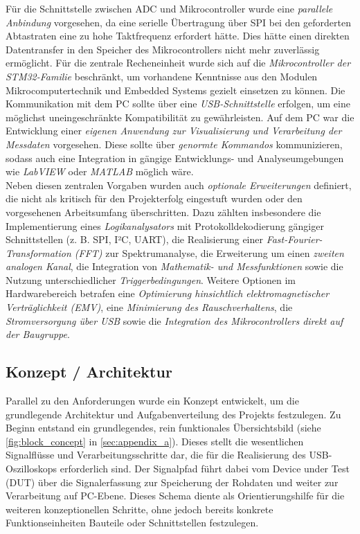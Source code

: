 \documentclass[a4paper, portrait, 12pt]{scrartcl} %
\begin{document}
Für die Schnittstelle zwischen ADC und Mikrocontroller wurde eine \emph{parallele Anbindung} vorgesehen, da eine serielle Übertragung über SPI bei den geforderten Abtastraten eine zu hohe Taktfrequenz erfordert hätte. Dies hätte einen direkten Datentransfer in den Speicher des Mikrocontrollers nicht mehr zuverlässig ermöglicht. Für die zentrale Recheneinheit wurde sich auf die \emph{Mikrocontroller der STM32-Familie} beschränkt, um vorhandene Kenntnisse aus den Modulen Mikrocomputertechnik und Embedded Systems gezielt einsetzen zu können. Die Kommunikation mit dem PC sollte über eine \emph{USB-Schnittstelle} erfolgen, um eine möglichst uneingeschränkte Kompatibilität zu gewährleisten. Auf dem PC war die Entwicklung einer \emph{eigenen Anwendung zur Visualisierung und Verarbeitung der Messdaten} vorgesehen. Diese sollte über \emph{genormte Kommandos} kommunizieren, sodass auch eine Integration in gängige Entwicklungs- und Analyseumgebungen wie \emph{LabVIEW} oder \emph{MATLAB} möglich wäre.\\

Neben diesen zentralen Vorgaben wurden auch \emph{optionale Erweiterungen} definiert, die nicht als kritisch für den Projekterfolg eingestuft wurden oder den vorgesehenen Arbeitsumfang überschritten. Dazu zählten insbesondere die Implementierung eines \emph{Logikanalysators} mit Protokolldekodierung gängiger Schnittstellen (z. B. SPI, I²C, UART), die Realisierung einer \emph{Fast-Fourier-Transformation (FFT)} zur Spektrumanalyse, die Erweiterung um einen \emph{zweiten analogen Kanal}, die Integration von \emph{Mathematik- und Messfunktionen} sowie die Nutzung unterschiedlicher \emph{Triggerbedingungen}. Weitere Optionen im Hardwarebereich betrafen eine \emph{Optimierung hinsichtlich elektromagnetischer Verträglichkeit (EMV)}, eine \emph{Minimierung des Rauschverhaltens}, die \emph{Stromversorgung über USB} sowie die \emph{Integration des Mikrocontrollers direkt auf der Baugruppe}.

\subsection{Konzept / Architektur}
Parallel zu den Anforderungen wurde ein Konzept entwickelt, um die grundlegende Architektur und Aufgabenverteilung des Projekts festzulegen. Zu Beginn entstand ein grundlegendes, rein funktionales Übersichtsbild (siehe \autoref{fig:block_concept} in \autoref{sec:appendix_a}). Dieses stellt die wesentlichen Signalflüsse und Verarbeitungsschritte dar, die für die Realisierung des USB-Oszilloskops erforderlich sind. Der Signalpfad führt dabei vom Device under Test (DUT) über die Signalerfassung zur Speicherung der Rohdaten und weiter zur Verarbeitung auf PC-Ebene. Dieses Schema diente als Orientierungshilfe für die weiteren konzeptionellen Schritte, ohne jedoch bereits konkrete Funktionseinheiten Bauteile oder Schnittstellen festzulegen.\\
\end{document}
